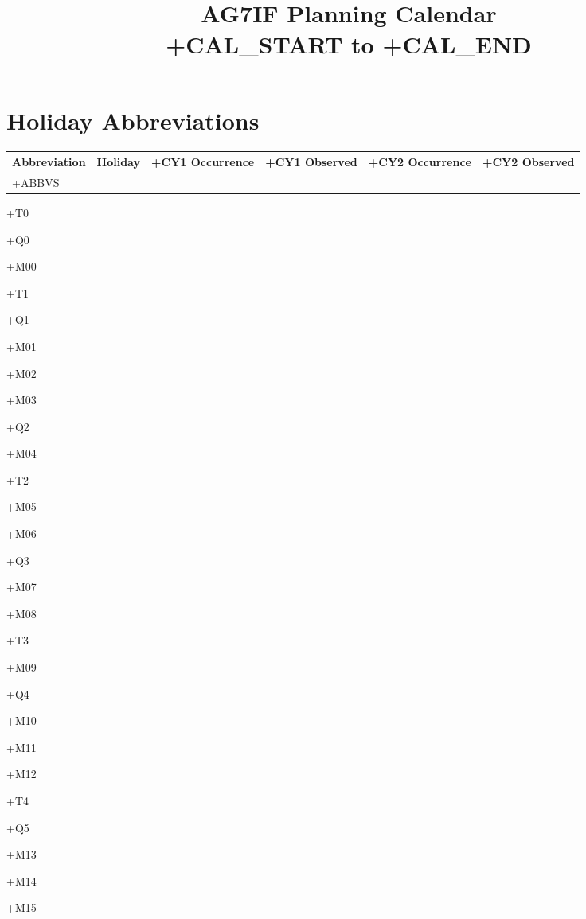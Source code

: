 \documentclass[10pt]{book}
\title{\Huge{}AG7IF Planning Calendar \\ +CAL_START to +CAL_END}
\author{}
\date{}
\begin{document}
\maketitle

\section*{Holiday Abbreviations}
\begin{tabularx}{\textwidth}{lXrrrr}
    \toprule
    Abbreviation & Holiday & +CY1 Occurrence & +CY1 Observed & +CY2 Occurrence & +CY2 Observed \\
    \midrule
    +ABBVS
    \bottomrule
\end{tabularx}

+T0

+Q0

+M00

+T1

+Q1

+M01

+M02

+M03

+Q2

+M04

+T2

+M05

+M06

+Q3

+M07

+M08

+T3

+M09

+Q4

+M10

+M11

+M12

+T4

+Q5

+M13

+M14

+M15
\end{document}
